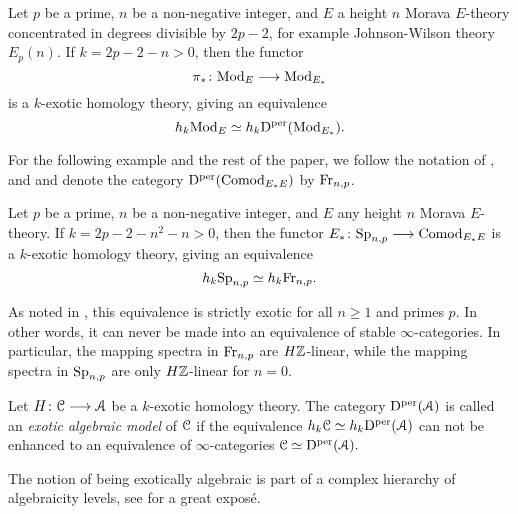 \begin{example}
    \label{ch1:ex:chromatic-algebraicity-modules}
    Let $p$ be a prime, $n$ be a non-negative integer, and $E$ a height $n$ Morava $E$-theory concentrated in degrees divisible by $2p-2$, for example Johnson-Wilson theory $E_p(n)$. If $k=2p-2-n>0$, then the functor 
    \[\pi_* \colon \mathrm{Mod}_{E} \longrightarrow \mathrm{Mod}_{E_*}\]
    is a $k$-exotic homology theory, giving an equivalence 
    \[h_k \mathrm{Mod}_{E} \simeq h_k \mathrm{D}^{\mathrm{per}}(\mathrm{Mod}_{E_*}).\]
\end{example}
    
\begin{notation}
    For the following example and the rest of the paper, we follow the notation of \cite{barthel-schlank-stapleton_2020}, \cite{barthel-schlank-stapleton_2021} and \cite{barkan_2023} and denote the category $\mathrm{D}^{\mathrm{per}}(\mathrm{Comod}_{E_*E})$ by $\mathrm{Fr}_{n,p}$. 
\end{notation}
    
\begin{example}
    \label{ch1:ex:chromatic-algebraicity}
    Let $p$ be a prime, $n$ be a non-negative integer, and $E$ any height $n$ Morava $E$-theory. If $k=2p-2-n^2-n>0$, then the functor $E_* \colon \mathrm{Sp}_{n,p}\longrightarrow \mathrm{Comod}_{E_*E}$ is a $k$-exotic homology theory, giving an equivalence 
    \[h_k \mathrm{Sp}_{n,p} \simeq h_k \mathrm{Fr}_{n,p}.\]
\end{example}

\begin{remark}
    As noted in \cite[5.29]{barthel-schlank-stapleton_2020}, this equivalence is strictly exotic for all $n\geq 1$ and primes $p$. In other words, it can never be made into an equivalence of stable $\infty$-categories. In particular, the mapping spectra in $\mathrm{Fr}_{n,p}$ are $H\mathbb{Z}$-linear, while the mapping spectra in $\mathrm{Sp}_{n,p}$ are only $H\mathbb{Z}$-linear for $n=0$. 
\end{remark}
    
\begin{definition}
    Let $H\colon \EuScript{C}\longrightarrow \EuScript{A}$ be a $k$-exotic homology theory. The category $\mathrm{D}^{\mathrm{per}}(\EuScript{A})$ is called an \emph{exotic algebraic model} of $\EuScript{C}$ if the equivalence $h_k \EuScript{C} \simeq h_k \mathrm{D}^{\mathrm{per}}(\EuScript{A})$ can not be enhanced to an equivalence of $\infty$-categories $\EuScript{C}\simeq \mathrm{D}^{\mathrm{per}}(\EuScript{A}).$
\end{definition}

\begin{remark}
    The notion of being exotically algebraic is part of a complex hierarchy of algebraicity levels, see \cite{ishak-roitzheim-williamson_2023} for a great exposé. 
\end{remark}
    
